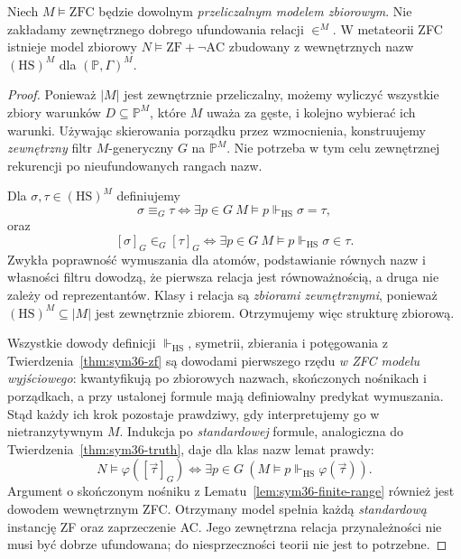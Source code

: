 \begin{lemat}
\label{lem:sym36-arbitrary-model}
Niech $M\models\mathrm{ZFC}$ będzie dowolnym
\emph{przeliczalnym modelem zbiorowym}.
Nie zakładamy zewnętrznego dobrego ufundowania
relacji $\in^M$.
W metateorii ZFC istnieje model zbiorowy
$N\models\mathrm{ZF}+\neg\mathrm{AC}$
zbudowany z wewnętrznych nazw
$(\mathrm{HS})^M$ dla
$(\mathbb P,\Gamma)^M$.
\end{lemat}
\begin{proof}
Ponieważ $|M|$ jest zewnętrznie
przeliczalny, możemy wyliczyć
wszystkie zbiory warunków
$D\subseteq\mathbb P^M$, które
$M$ uważa za gęste, i kolejno
wybierać ich warunki. Używając
skierowania porządku przez wzmocnienia,
konstruujemy \emph{zewnętrzny} filtr
$M$-generyczny $G$ na $\mathbb P^M$.
Nie potrzeba w tym celu zewnętrznej
rekurencji po nieufundowanych rangach nazw.

Dla $\sigma,\tau\in(\mathrm{HS})^M$
definiujemy
\[
 \sigma\equiv_G\tau
 \iff\exists p\in G\
     M\models p\Vdash_{\mathrm{HS}}\sigma=\tau,
\]
oraz
\[
 [\sigma]_G\in_G[\tau]_G
 \iff\exists p\in G\
     M\models p\Vdash_{\mathrm{HS}}\sigma\in\tau.
\]
Zwykła poprawność wymuszania dla
atomów, podstawianie równych nazw
i własności filtru dowodzą,
że pierwsza relacja jest równoważnością,
a druga nie zależy od reprezentantów.
Klasy i relacja są \emph{zbiorami zewnętrznymi},
ponieważ $(\mathrm{HS})^M\subseteq|M|$
jest zewnętrznie zbiorem.
Otrzymujemy więc strukturę zbiorową.

Wszystkie dowody definicji
$\Vdash_{\mathrm{HS}}$, symetrii,
zbierania i potęgowania z
Twierdzenia~\ref{thm:sym36-zf}
są dowodami pierwszego rzędu
\emph{w ZFC modelu wyjściowego}:
kwantyfikują po zbiorowych nazwach,
skończonych nośnikach i porządkach,
a przy ustalonej formule mają
definiowalny predykat wymuszania.
Stąd każdy ich krok pozostaje
prawdziwy, gdy interpretujemy go
w nietranzytywnym $M$.
Indukcja po \emph{standardowej}
formule, analogiczna do
Twierdzenia~\ref{thm:sym36-truth},
daje dla klas nazw lemat prawdy:
\[
 N\models\varphi([\vec\tau]_G)
 \iff\exists p\in G\
       (M\models p\Vdash_{\mathrm{HS}}
          \varphi(\vec\tau)).
\]
Argument o skończonym nośniku
z Lematu~\ref{lem:sym36-finite-range}
również jest dowodem wewnętrznym
ZFC. Otrzymany model spełnia
każdą \emph{standardową}
instancję ZF oraz zaprzeczenie AC.
Jego zewnętrzna relacja przynależności
nie musi być dobrze ufundowana;
do niesprzeczności teorii nie
jest to potrzebne.
\end{proof}


